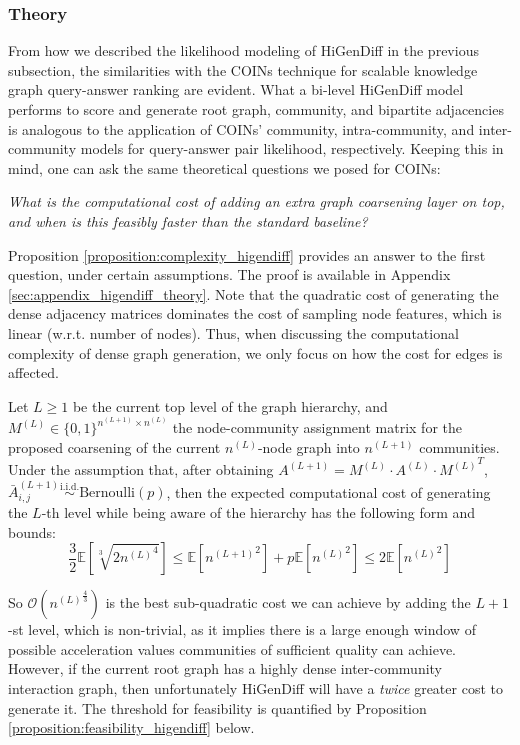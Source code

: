 \subsubsection{Theory}
From how we described the likelihood modeling of HiGenDiff in the previous subsection, the similarities with the COINs technique for scalable knowledge graph query-answer ranking are evident. What a bi-level HiGenDiff model performs to score and generate root graph, community, and bipartite adjacencies is analogous to the application of COINs' community, intra-community, and inter-community models for query-answer pair likelihood, respectively. Keeping this in mind, one can ask the same theoretical questions we posed for COINs: 

\emph{What is the computational cost of adding an extra graph coarsening layer on top, and when is this feasibly faster than the standard baseline?}

Proposition \ref{proposition:complexity_higendiff} provides an answer to the first question, under certain assumptions. The proof is available in Appendix \ref{sec:appendix_higendiff_theory}. Note that the quadratic cost of generating the dense adjacency matrices dominates the cost of sampling node features, which is linear (w.r.t. number of nodes). Thus, when discussing the computational complexity of dense graph generation, we only focus on how the cost for edges is affected.

\begin{proposition}
    \label{proposition:complexity_higendiff}
    Let $L \geq 1$ be the current top level of the graph hierarchy, and $M^{(L)} \in \{0,1\}^{n^{(L+1)}\times n^{(L)}}$ the node-community assignment matrix for the proposed coarsening of the current $n^{(L)}$-node graph into $n^{(L+1)}$ communities. Under the assumption that, after obtaining $A^{(L+1)}=M^{(L)} \cdot A^{(L)} \cdot {M^{(L)}}^T$, $\bar{A}_{i,j}^{(L+1)} \overset{\text{i.i.d.}}{\sim} \text{Bernoulli}(p)$, then the expected computational cost of generating the $L$-th level while being aware of the hierarchy has the following form and bounds:
    \begin{equation}
         \frac{3}{2}\mathbb{E}[\sqrt[3]{2{n^{(L)}}^4}] \leq \mathbb{E}[{n^{(L+1)}}^2] + p \mathbb{E}[{n^{(L)}}^2] \leq 2\mathbb{E}[{n^{(L)}}^2]
    \end{equation}
\end{proposition}

So $\mathcal{O}({n^{(L)}}^{\frac{4}{3}})$ is the best sub-quadratic cost we can achieve by adding the $L+1$-st level, which is non-trivial, as it implies there is a large enough window of possible acceleration values communities of sufficient quality can achieve. However, if the current root graph has a highly dense inter-community interaction graph, then unfortunately HiGenDiff will have a \emph{twice} greater cost to generate it. The threshold for feasibility is quantified by Proposition \ref{proposition:feasibility_higendiff} below.

